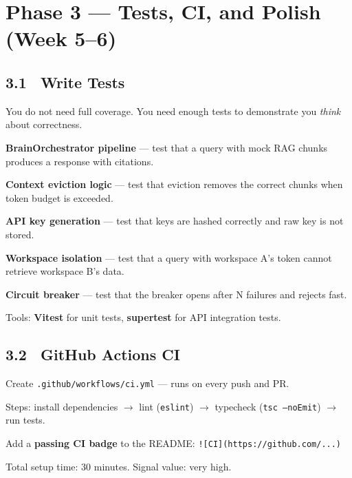 \documentclass[11pt, a4paper]{article}
\DeclareRobustCommand{\badge}[2]{%
  \tikz[baseline=(n.base)]{
    \node[inner sep=3pt, rounded corners=3pt,
          fill=#1!15, text=#1!70!black,
          font=\fontsize{8}{8}\selectfont\bfseries] (n) {#2};
  }%
}
\DeclareRobustCommand{\medium}{\badge{primary}{MEDIUM}}
\begin{document}
\section{Phase 3 — Tests, CI, and Polish (Week 5–6)}

\subsection{3.1 \ Write Tests \hfill \medium}

You do not need full coverage. You need enough tests to demonstrate you \textit{think} about correctness.

\begin{checklist}
  \item \textbf{BrainOrchestrator pipeline} — test that a query with mock RAG chunks produces a response with citations.
  \item \textbf{Context eviction logic} — test that eviction removes the correct chunks when token budget is exceeded.
  \item \textbf{API key generation} — test that keys are hashed correctly and raw key is not stored.
  \item \textbf{Workspace isolation} — test that a query with workspace A's token cannot retrieve workspace B's data.
  \item \textbf{Circuit breaker} — test that the breaker opens after N failures and rejects fast.
  \item Tools: \textbf{Vitest} for unit tests, \textbf{supertest} for API integration tests.
\end{checklist}

\subsection{3.2 \ GitHub Actions CI \hfill \medium}

\begin{checklist}
  \item Create \texttt{.github/workflows/ci.yml} — runs on every push and PR.
  \item Steps: install dependencies $\rightarrow$ lint (\texttt{eslint}) $\rightarrow$ typecheck (\texttt{tsc --noEmit}) $\rightarrow$ run tests.
  \item Add a \textbf{passing CI badge} to the README: \texttt{![CI](https://github.com/...)}
  \item Total setup time: 30 minutes. Signal value: very high.
\end{checklist}
\end{document}
